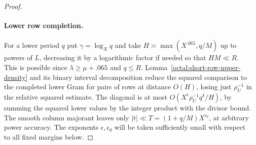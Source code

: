 \documentclass[11pt,a4paper]{article}
\theoremstyle{paperplain}
\numberwithin{equation}{section}
\begin{document}
\begin{proof}
\paragraph{Lower row completion.}
For a lower period $q$ put $\gamma=\log_X q$ and take
$H\asymp\max(X^{.065},q/M)$ up to powers of $L$, decreasing
it by a logarithmic factor if needed so that $HM\ll R$.
This is possible since $\lambda\ge\mu+.065$ and $q\le R$.
Lemma~\ref{octal:short-row-upper-density}
and its binary interval decomposition reduce the squared
comparison to the completed lower Gram for pairs of rows at
distance $O(H)$, losing just $\rho_U^{-1}$ in the relative
squared estimate. The diagonal is at most
$O(X^\epsilon \rho_U^{-1} q^\delta/H)$, by summing the squared
lower values by the integer product with the divisor bound.
The smooth column majorant leaves only
$|t|\ll T=(1+q/M)X^{\epsilon_0}$, at arbitrary power accuracy.
The exponents $\epsilon,\epsilon_0$ will be taken sufficiently
small with respect to all fixed margins below.


\end{proof}
\end{document}
